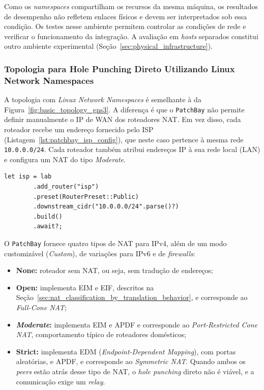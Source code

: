 Como os \textit{namespaces} compartilham os recursos da mesma máquina, os resultados de desempenho não refletem enlaces físicos e devem ser interpretados sob essa condição. Os testes nesse ambiente permitem controlar as condições de rede e verificar o funcionamento da integração. A avaliação em \textit{hosts} separados constitui outro ambiente experimental (Seção~\ref{sec:physical_infrastructure}).

\subsubsection{Topologia para Hole Punching Direto Utilizando Linux Network Namespaces}
\label{sec:basic_topology_network_namespaces}

A topologia com \textit{Linux Network Namespaces} é semelhante à da Figura~\ref{fig:basic_topology_gns3}. A diferença é que o \texttt{PatchBay} não permite definir manualmente o IP de WAN dos roteadores NAT. Em vez disso, cada roteador recebe um endereço fornecido pelo ISP (Listagem~\ref{lst:patchbay_isp_config}), que neste caso pertence à mesma rede \texttt{10.0.0.0/24}. Cada roteador também atribui endereços IP à sua rede local (LAN) e configura um NAT do tipo \textit{Moderate}.

\begin{lstlisting}[float=htbp, caption={Configuração do ISP no \texttt{PatchBay}.}, label={lst:patchbay_isp_config}]
    let isp = lab
        .add_router("isp")
        .preset(RouterPreset::Public)
        .downstream_cidr("10.0.0.0/24".parse()?)
        .build()
        .await?;
\end{lstlisting}

O \texttt{PatchBay} \citep{patchbay} fornece quatro tipos de NAT para IPv4, além de um modo customizável (\textit{Custom}), de variações para IPv6 e de \textit{firewalls}:

\begin{itemize}
    \item \textbf{None:} roteador sem NAT, ou seja, sem tradução de endereços;
    \item \textbf{Open:} implementa EIM e EIF, descritos na Seção~\ref{sec:nat_classification_by_translation_behavior}, e corresponde ao \textit{Full-Cone NAT};
    \item \textbf{\textit{Moderate}:} implementa EIM e APDF e corresponde ao \textit{Port-Restricted Cone NAT}, comportamento típico de roteadores domésticos;
    \item \textbf{Strict:} implementa EDM (\textit{Endpoint-Dependent Mapping}), com portas aleatórias, e APDF, e corresponde ao \textit{Symmetric NAT}. Quando ambos os \textit{peers} estão atrás desse tipo de NAT, o \textit{hole punching} direto não é viável, e a comunicação exige um \textit{relay}.
\end{itemize}

